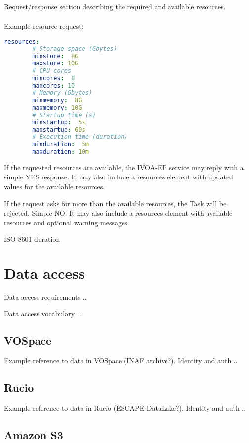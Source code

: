 \documentclass[11pt,a4paper]{ivoa}
\newcommand{\ivoep} {IVOA-EP\xspace}
\begin{document}
Request/response section describing the required and available resources.
\\
\\
Example resource request:
\begin{lstlisting}[language=yaml]
    resources:
        # Storage space (Gbytes)
        minstore:  8G
        maxstore: 10G
        # CPU cores
        mincores:  8
        maxcores: 10
        # Memory (Gbytes)
        minmemory:  8G
        maxmemory: 10G
        # Startup time (s)
        minstartup:  5s
        maxstartup: 60s
        # Execution time (duration)
        minduration:  5m
        maxduration: 10m
\end{lstlisting}

If the requested resources are available, the \ivoep service may reply with a simple YES response. It may also include a resources element with updated values for the available resources.


If the request asks for more than the available resources, the Task will be rejected.
Simple NO. It may also include a resources element with available resources and optional warning messages.

ISO 8601 duration

\section{Data access}
\label{sec:data-access}

Data access requirements ..

Data access vocabulary ..

\subsection{VOSpace}
\label{sec:data-access-vospace}

Example reference to data in VOSpace (INAF archive?).
Identity and auth ..

\subsection{Rucio}
\label{sec:data-access-rucio}

Example reference to data in Rucio (ESCAPE DataLake?).
Identity and auth ..

\subsection{Amazon S3}
\label{sec:data-access-amazons3}
\end{document}
